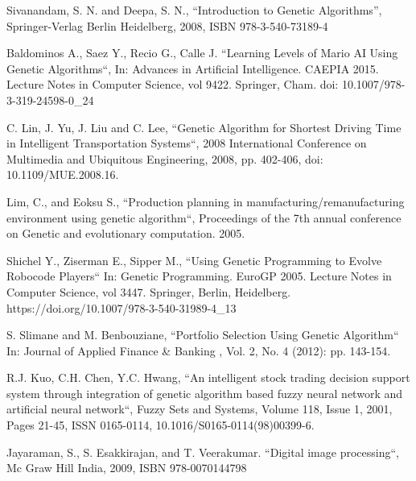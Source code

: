 \documentclass[conference]{IEEEtran}
\begin{document}
\begin{thebibliography}{00}

Sivanandam, S. N. and Deepa, S. N., ``Introduction to Genetic Algorithms'',
	Springer-Verlag Berlin Heidelberg, 2008, ISBN 978-3-540-73189-4

Baldominos A., Saez Y., Recio G., Calle J. ``Learning Levels of Mario AI Using Genetic Algorithms``,
	In: Advances in Artificial Intelligence. CAEPIA 2015. Lecture Notes in Computer Science, vol 9422. Springer, Cham. doi: 10.1007/978-3-319-24598-0\_24

C. Lin, J. Yu, J. Liu and C. Lee, ``Genetic Algorithm for Shortest Driving Time in Intelligent Transportation Systems``, 2008 International Conference on Multimedia and Ubiquitous Engineering, 2008, pp. 402-406, doi: 10.1109/MUE.2008.16.

Lim, C., and Eoksu S., ``Production planning in manufacturing/remanufacturing environment using genetic algorithm``, Proceedings of the 7th annual conference on Genetic and evolutionary computation. 2005.

Shichel Y., Ziserman E., Sipper M., ``Using Genetic Programming to Evolve Robocode Players`` In: Genetic Programming. EuroGP 2005. Lecture Notes in Computer Science, vol 3447. Springer, Berlin, Heidelberg. https://doi.org/10.1007/978-3-540-31989-4\_13

S. Slimane and M. Benbouziane, ``Portfolio Selection Using Genetic Algorithm`` In: Journal of Applied Finance \& Banking , Vol. 2, No. 4 (2012): pp. 143-154.

R.J. Kuo, C.H. Chen, Y.C. Hwang, ``An intelligent stock trading decision support system through integration of genetic algorithm based fuzzy neural network and artificial neural network``,
Fuzzy Sets and Systems,
Volume 118, Issue 1,
2001,
Pages 21-45,
ISSN 0165-0114,
10.1016/S0165-0114(98)00399-6.

Jayaraman, S., S. Esakkirajan, and T. Veerakumar. ``Digital image processing``, Mc Graw Hill India, 2009, ISBN 978-0070144798


\end{thebibliography}
\end{document}
